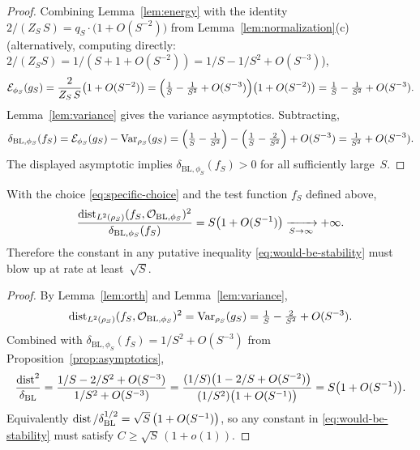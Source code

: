 \begin{proof}
Combining Lemma~\ref{lem:energy} with the identity
$2/(Z_S\,S)=q_S\cdot\bigl(1+O(S^{-2})\bigr)$ from
Lemma~\ref{lem:normalization}(c) (alternatively, computing directly:
$2/(Z_S S)=1/(S+1+O(S^{-2}))=1/S-1/S^2+O(S^{-3})$),
\[
  \mathcal E_{\phi_S}(g_S)
  =\frac{2}{Z_S\,S}\bigl(1+O(S^{-2})\bigr)
  =\Bigl(\tfrac{1}{S}-\tfrac{1}{S^2}+O(S^{-3})\Bigr)\bigl(1+O(S^{-2})\bigr)
  =\tfrac{1}{S}-\tfrac{1}{S^2}+O(S^{-3}).
\]
Lemma~\ref{lem:variance} gives the variance asymptotics. Subtracting,
\[
  \delta_{\mathrm{BL},\phi_S}(f_S)
  =\mathcal E_{\phi_S}(g_S)-\operatorname{Var}_{\rho_S}(g_S)
  =\Bigl(\tfrac{1}{S}-\tfrac{1}{S^2}\Bigr)
   -\Bigl(\tfrac{1}{S}-\tfrac{2}{S^2}\Bigr)+O(S^{-3})
  =\tfrac{1}{S^2}+O(S^{-3}).
\]
The displayed asymptotic implies $\delta_{\mathrm{BL},\phi_S}(f_S)>0$ for all
sufficiently large~$S$.
\end{proof}

\begin{theorem}\label{thm:1d}
With the choice \eqref{eq:specific-choice} and the test function $f_S$
defined above,
\[
  \frac{\operatorname{dist}_{L^2(\rho_S)}(f_S,\mathcal O_{\mathrm{BL},\phi_S})^2}
       {\delta_{\mathrm{BL},\phi_S}(f_S)}
  =S\bigl(1+O(S^{-1})\bigr)\xrightarrow[S\to\infty]{}+\infty.
\]
Therefore the constant in any putative inequality
\eqref{eq:would-be-stability} must blow up at rate at least~$\sqrt S$.
\end{theorem}

\begin{proof}
By Lemma~\ref{lem:orth} and Lemma~\ref{lem:variance},
\[
  \operatorname{dist}_{L^2(\rho_S)}(f_S,\mathcal O_{\mathrm{BL},\phi_S})^2
  =\operatorname{Var}_{\rho_S}(g_S)
  =\tfrac{1}{S}-\tfrac{2}{S^2}+O(S^{-3}).
\]
Combined with $\delta_{\mathrm{BL},\phi_S}(f_S)=1/S^2+O(S^{-3})$ from
Proposition~\ref{prop:asymptotics},
\[
  \frac{\operatorname{dist}^2}{\delta_{\mathrm{BL}}}
  =\frac{1/S-2/S^2+O(S^{-3})}{1/S^2+O(S^{-3})}
  =\frac{(1/S)\bigl(1-2/S+O(S^{-2})\bigr)}
        {(1/S^2)\bigl(1+O(S^{-1})\bigr)}
  =S\bigl(1+O(S^{-1})\bigr).
\]
Equivalently $\operatorname{dist}/\delta_{\mathrm{BL}}^{1/2}=\sqrt S\,\bigl(1+O(S^{-1})\bigr)$,
so any constant in \eqref{eq:would-be-stability} must satisfy
$C\ge\sqrt S\,(1+o(1))$.
\end{proof}
